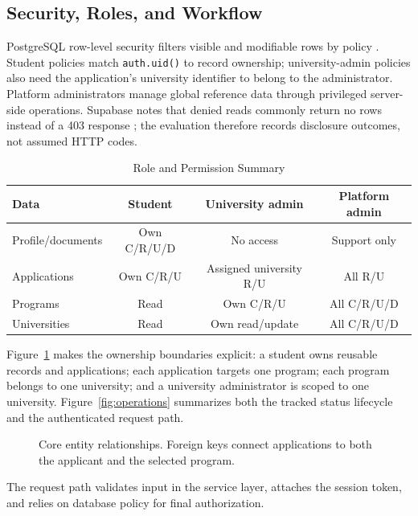 \documentclass[conference,letterpaper]{IEEEtran}
\begin{document}
\subsection{Security, Roles, and Workflow}
PostgreSQL row-level security filters visible and modifiable rows by policy \cite{postgresql}. Student policies match \texttt{auth.uid()} to record ownership; university-admin policies also need the application's university identifier to belong to the administrator. Platform administrators manage global reference data through privileged server-side operations. Supabase notes that denied reads commonly return no rows instead of a 403 response \cite{supabase}; the evaluation therefore records disclosure outcomes, not assumed HTTP codes.

\begin{table}[!t]
\caption{Role and Permission Summary}
\label{tab:roles}
\centering\scriptsize
\setlength{\tabcolsep}{2.2pt}\renewcommand{\arraystretch}{1.05}
\begin{tabular}{@{}lccc@{}}
\toprule
Data & Student & University admin & Platform admin\\
\midrule
Profile/documents & Own C/R/U/D & No access & Support only\\
Applications & Own C/R/U & Assigned university R/U & All R/U\\
Programs & Read & Own C/R/U & All C/R/U/D\\
Universities & Read & Own read/update & All C/R/U/D\\
\bottomrule
\end{tabular}
\end{table}

Figure~\ref{fig:erd} makes the ownership boundaries explicit: a student owns reusable records and applications; each application targets one program; each program belongs to one university; and a university administrator is scoped to one university. Figure~\ref{fig:operations} summarizes both the tracked status lifecycle and the authenticated request path.

\begin{figure}[!t]
\centering
\resizebox{0.94\columnwidth}{!}{}
\caption{Core entity relationships. Foreign keys connect applications to both the applicant and the selected program.}
\label{fig:erd}
\end{figure}

The request path validates input in the service layer, attaches the session token, and relies on database policy for final authorization.
\end{document}
